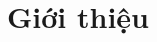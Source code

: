 \documentclass{my_style}
\begin{document}

	
\newpage
\tableofcontents	
\listoffigures
\listoftables	
\newpage
	
\chapter{Giới thiệu}
\label{Introduction}
\end{document}
